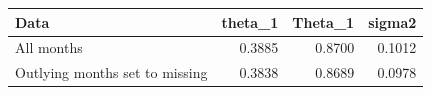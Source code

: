 
\begin{tabular}[t]{lrrr}
\toprule
Data & theta\_1 & Theta\_1 & sigma2\\
\midrule
All months & 0.3885 & 0.8700 & 0.1012\\
Outlying months set to missing & 0.3838 & 0.8689 & 0.0978\\
\bottomrule
\end{tabular}
